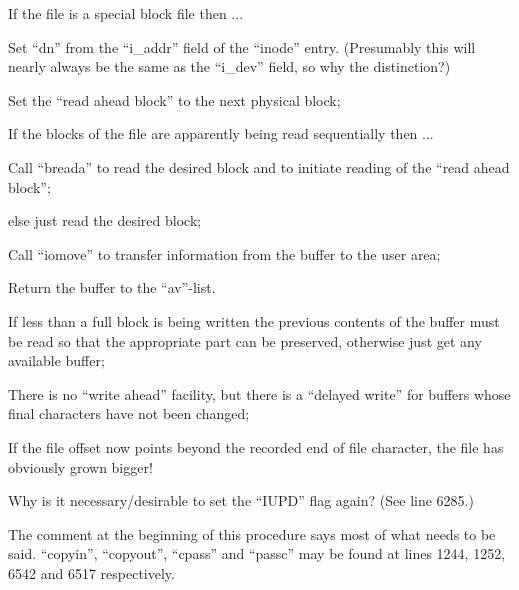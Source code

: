 \item[6251:] If the file is a special block
 file then ...

\item[6252:] Set ``dn'' from the ``i\_addr'' field
 of the ``inode'' entry. (Presumably
 this will nearly always be the
 same as the ``i\_dev'' field, so why
 the distinction?)

\item[6253:] Set the ``read ahead block'' to the
 next physical block;

\item[6255:] If the blocks of the file are
 apparently being read sequentially then ...

\item[6256:] Call ``breada'' to read the desired
 block and to initiate reading of
 the ``read ahead block'';

\item[6258:] else just read the desired block;

\item[6260:] Call ``iomove'' to transfer information from the buffer to the
 user area;

\item[6261:] Return the buffer to the
 ``av''-list.
\ed



\bd
\item[6303:] If less than a full block is
 being written the previous contents of the buffer must be read
 so that the appropriate part can
 be preserved, otherwise just get
 any available buffer;

\item[6311:] There is no ``write ahead'' facility, but there is a ``delayed
 write'' for buffers whose final
 characters have not been changed;

\item[6312:] If the file offset now points
 beyond the recorded end of file
 character, the file has obviously
 grown bigger!

\item[6318:] Why is it necessary/desirable to
 set the ``IUPD'' flag again? (See
 line 6285.)
\ed



The comment at the beginning of this
procedure says most of what needs to be
said. ``copyin'', ``copyout'', ``cpass'' and
``passc'' may be found at lines 1244,
1252, 6542 and 6517 respectively.



